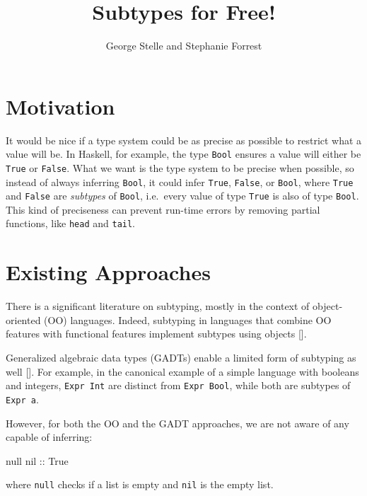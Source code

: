 \documentclass[]{article}
\title{Subtypes for Free!}
\author{George Stelle and Stephanie Forrest}
\date{}
\newenvironment{Shaded}{}{}
\newcommand{\DataTypeTok}[1]{\textcolor[rgb]{0.56,0.13,0.00}{{#1}}}
\newcommand{\OtherTok}[1]{\textcolor[rgb]{0.00,0.44,0.13}{{#1}}}
\newcommand{\NormalTok}[1]{{#1}}
\begin{document}
\maketitle

\section{Motivation}\label{motivation}

It would be nice if a type system could be as precise as possible to
restrict what a value will be. In Haskell, for example, the type
\texttt{Bool} ensures a value will either be \texttt{True} or
\texttt{False}. What we want is the type system to be precise when
possible, so instead of always inferring \texttt{Bool}, it could infer
\texttt{True}, \texttt{False}, or \texttt{Bool}, where \texttt{True} and
\texttt{False} are \emph{subtypes} of \texttt{Bool}, i.e.~every value of
type \texttt{True} is also of type \texttt{Bool}. This kind of
preciseness can prevent run-time errors by removing partial functions,
like \texttt{head} and \texttt{tail}.

\section{Existing Approaches}\label{existing-approaches}

There is a significant literature on subtyping, mostly in the context of
object-oriented (OO) languages. Indeed, subtyping in languages that
combine OO features with functional features implement subtypes using
objects {[}\cite{odersky2004overview, leroy2014ocaml}{]}.

Generalized algebraic data types (GADTs) enable a limited form of
subtyping as well {[}\cite{fluet2006phantom}{]}. For example, in the
canonical example of a simple language with booleans and integers,
\texttt{Expr Int} are distinct from \texttt{Expr Bool}, while both are
subtypes of \texttt{Expr a}.

However, for both the OO and the GADT approaches, we are not aware of
any capable of inferring:

\begin{Shaded}
\begin{Highlighting}[]
   \NormalTok{null}\OtherTok{ nil ::} \DataTypeTok{True}
\end{Highlighting}
\end{Shaded}

where \texttt{null} checks if a list is empty and \texttt{nil} is the
empty list.
\end{document}
